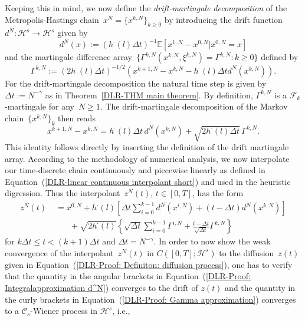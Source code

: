 Keeping this in mind, we now define the \textit{drift-martingale decomposition} of the Metropolis-Hastings chain~$x^N = \{ x^{k,N} \}_{k \geq 0}$ by introducing the drift function~$d^N: \mathcal{H}^s \to \mathcal{H}^s$ given by
\begin{equation}
\label{DLR-Proof: Definition drift function d^N}
d^N (x) := \left(  h^{\cdot}(l) \Delta t \right)^{-1} \mathbb{E} \left[ x^{1,N} - x^{0,N} | x^{0,N} = x \right] 
\end{equation}
and the martingale difference array~$\{ \Gamma^{k,N} (x^{k,N}, \xi^{k,N})= \Gamma^{k,N} : k \geq 0 \}$ defined by
\begin{equation}
 \label{DLR-Proof: Definiton martingale difference array}
 \Gamma^{k,N} := \left( 2 h^{\cdot}(l) \Delta t \right)^{-1/2} \left( x^{k+1,N} -x^{k,N} - h^{\cdot}(l) \Delta t d^N (x^{k,N})  \right).
\end{equation}
For the drift-martingale decomposition the natural time step is given by $\Delta t := N^{-\gamma}$ as in Theorem~\ref{DLR-THM main theorem}. By definition, $\Gamma^{k,N}$ is a $\mathcal{F}_k$-martingale for any~$N\geq1$. The drift-martingale decomposition of the Markov chain~$\{ x^{k,N} \}_{k}$ then reads
\begin{equation}
 \label{DLR-Proof: Definition drift-martingale decomposition}
 x^{k+1,N} - x^{k,N} = h^{\cdot}(l) \Delta t \, d^N(x^{k,N}) + \sqrt{2 h^{\cdot}(l) \Delta t} \, \Gamma^{k,N}.
\end{equation}
This identity follows directly by inserting the definition of the drift martingale array. According to the methodology of numerical analysis, we now interpolate our time-discrete chain continuously and piecewise linearly as defined in Equation~(\ref{DLR-linear continuous interpolant short}) and used in the heuristic digression. Thus the interpolant~$z^N(t)$, $t \in [0,T]$, has the form 
\begin{align}
  z^N(t) & \; = x^{0,N} + h^{\cdot}(l) \left[ \Delta t \sum_{i=0}^{k-1} d^N(x^{i,N}) + (t - \Delta t) d^N(x^{k,N}) \right] \label{DLR-Proof: Integralapproximation d^N} \\ 
  & \qquad + \sqrt{2 h^{\cdot}(l)} \left\{ \sqrt{ \Delta t} \sum_{i=0}^{k-1} \Gamma^{i,N} +  \frac{t - \Delta t}{\sqrt{\Delta t}} \Gamma^{k,N} \right\} \label{DLR-Proof: Gamma approximation}
\end{align}
for $k \Delta t \leq t  < (k+1) \Delta t $ and $\Delta t = N^{-\gamma}$. In order to now show the weak convergence of the interpolant~$z^N(t)$ in $C([0,T];\mathcal{H}^s)$ to the diffusion~$z(t)$ given in Equation~(\ref{DLR-Proof: Definiton: diffusion process}), one has to verify that the quantity in the angular brackets in Equation~(\ref{DLR-Proof: Integralapproximation d^N}) converges to the drift of $z(t)$ and the quantity in the curly brackets in Equation~(\ref{DLR-Proof: Gamma approximation}) converges to a $\mathcal{C}_s$-Wiener process in $\mathcal{H}^s$, i.e.,
